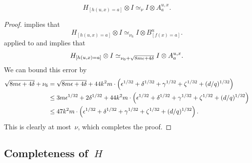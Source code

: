 \begin{corollary}
\begin{equation*}
H_{[h(u, x)=a]} \otimes I \simeq_{\nu} I \otimes A^{u,x}_a.
\end{equation*}
\end{corollary}
\begin{proof}
 implies that
\begin{equation}\label{eq:h-b-consistency-at-a-point}
H_{[h(u, x)=a]} \otimes I \simeq_{\nu_6} I \otimes B^{u}_{[f(x)=a]}.
\end{equation}
 applied to  and  implies that
\begin{equation*}
H_{[h(u, x)=a]} \otimes I \simeq_{\nu_6 + \sqrt{8m \epsilon + 4\delta}} I \otimes A^{u,x}_a.
\end{equation*}
We can bound this error by
\begin{align*}
\sqrt{8m \epsilon + 4\delta} + \nu_6
& = \sqrt{8m \epsilon + 4\delta}
	+ 44 k^2m \cdot \left(\epsilon^{1/32} + \delta^{1/32} +  \gamma^{1/32} +\zeta^{1/32} + (d/q)^{1/32}\right)\\
& \leq 3m \epsilon^{1/32} + 2\delta^{1/32}
	+ 44 k^2m \cdot \left(\epsilon^{1/32} + \delta^{1/32} +  \gamma^{1/32} + \zeta^{1/32} +(d/q)^{1/32}\right)\\
& \leq  47 k^2m \cdot \left(\epsilon^{1/32} + \delta^{1/32} +  \gamma^{1/32} + \zeta^{1/32} +(d/q)^{1/32}\right).
\end{align*}
This is clearly at most~$\nu$, which completes the proof.
\end{proof}

\subsection{Completeness of~$H$}
\label{sec:completeness-of-h-low-degree}

